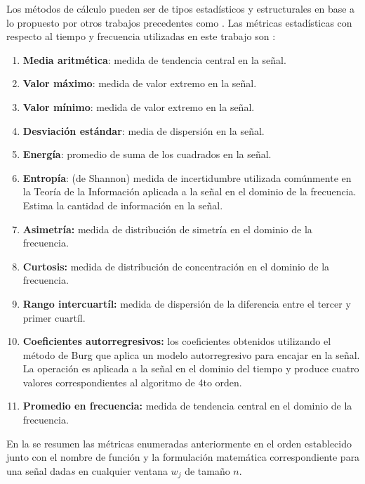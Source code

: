 Los métodos de cálculo pueden ser de tipos estadísticos y estructurales
\cite{LaraLabrador2013} en base a lo propuesto por otros trabajos
precedentes como \cite{Yang2009,Bao2004}. Las métricas estadísticas
con respecto al tiempo y frecuencia utilizadas en este trabajo son
\cite{ReyesOrtiz2015}:
\begin{enumerate}
\item \textbf{Media aritmética}: medida de tendencia central en la señal.
\item \textbf{Valor máximo}: medida de valor extremo en la señal.
\item \textbf{Valor mínimo}: medida de valor extremo en la señal.
\item \textbf{Desviación estándar}: media de dispersión en la señal.
\item \textbf{Energía}: promedio de suma de los cuadrados en la señal.
\item \textbf{Entropía}: (de Shannon) medida de incertidumbre utilizada
comúnmente en la Teoría de la Información aplicada a la señal en el
dominio de la frecuencia. Estima la cantidad de información en la
señal.
\item \textbf{Asimetría:} medida de distribución de simetría en el dominio
de la frecuencia.
\item \textbf{Curtosis:} medida de distribución de concentración en el dominio
de la frecuencia.
\item \textbf{Rango intercuartíl:} medida de dispersión de la diferencia
entre el tercer y primer cuartíl.
\item \textbf{Coeficientes autorregresivos:} los coeficientes obtenidos
utilizando el método de Burg que aplica un modelo autorregresivo para
encajar en la señal. La operación es aplicada a la señal en el dominio
del tiempo y produce cuatro valores correspondientes al algoritmo
de 4to orden.
\item \textbf{Promedio en frecuencia:} medida de tendencia central en el
dominio de la frecuencia.
\end{enumerate}
En la  se resumen las métricas enumeradas anteriormente
en el orden establecido junto con el nombre de función y la formulación
matemática correspondiente para una señal dada$s$ en cualquier ventana
$w_{j}$ de tamaño $n$.

